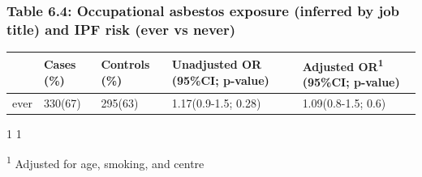 \hypertarget{table-6.4-occupational-asbestos-exposure-inferred-by-job-title-and-ipf-risk-ever-vs-never}{%
\subsubsection{Table 6.4: Occupational asbestos exposure (inferred by
job title) and IPF risk (ever vs
never)}\label{table-6.4-occupational-asbestos-exposure-inferred-by-job-title-and-ipf-risk-ever-vs-never}}

\begin{longtable}[]{@{}lllll@{}}
\toprule
\begin{minipage}[b]{0.06\columnwidth}\raggedright
\strut
\end{minipage} & \begin{minipage}[b]{0.10\columnwidth}\raggedright
Cases (\%)\strut
\end{minipage} & \begin{minipage}[b]{0.12\columnwidth}\raggedright
Controls (\%)\strut
\end{minipage} & \begin{minipage}[b]{0.29\columnwidth}\raggedright
Unadjusted OR (95\%CI; p-value)\strut
\end{minipage} & \begin{minipage}[b]{0.28\columnwidth}\raggedright
Adjusted OR\textsuperscript{1} (95\%CI; p-value)\strut
\end{minipage}\tabularnewline
\midrule
\endhead
\begin{minipage}[t]{0.06\columnwidth}\raggedright
ever\strut
\end{minipage} & \begin{minipage}[t]{0.10\columnwidth}\raggedright
330(67)\strut
\end{minipage} & \begin{minipage}[t]{0.12\columnwidth}\raggedright
295(63)\strut
\end{minipage} & \begin{minipage}[t]{0.29\columnwidth}\raggedright
1.17(0.9-1.5; 0.28)\strut
\end{minipage} & \begin{minipage}[t]{0.28\columnwidth}\raggedright
1.09(0.8-1.5; 0.6)\strut
\end{minipage}\tabularnewline
\bottomrule
\end{longtable}

1 \textbar{} 1 \textbar{}

\textsuperscript{1} Adjusted for age, smoking, and centre

